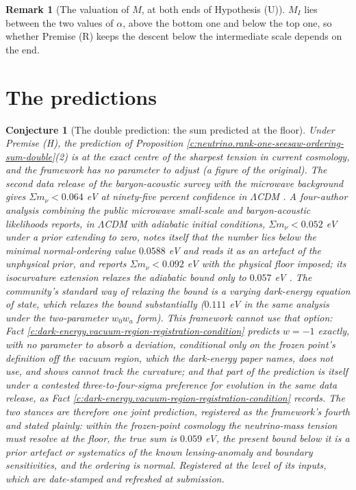 \documentclass[11pt]{article}
\newtheorem{conjecture}[theorem]{Conjecture}
\theoremstyle{definition}
\newtheorem{remark}[theorem]{Remark}
\theoremstyle{plain}
\providecommand{\mnu}{}\renewcommand{\mnu}{\Sigma m_{\nu}}
\begin{document}
\begin{remark}[The valuation of $M$, at both ends of Hypothesis (U)]
$M_{I}$ lies between the two values of $\alpha$, above the bottom one and below the top one, so whether Premise (R) keeps the descent below the intermediate scale depends on the end.
\end{remark}

\section{The predictions}

\begin{conjecture}[The double prediction: the sum predicted at the floor]\label{c:neutrino.double-prediction-sum-predicted-floor}
Under Premise (H), the prediction of Proposition \ref{c:neutrino.rank-one-seesaw-ordering-sum-double}(2) is at the exact centre of the sharpest tension in current cosmology, and the framework has no parameter to adjust (a figure of the original). The second data release of the baryon-acoustic survey with the microwave background gives $\mnu < 0.064$ eV at ninety-five percent confidence in $\Lambda$CDM \cite{DESI2025}. A four-author analysis combining the public microwave small-scale and baryon-acoustic likelihoods reports, in $\Lambda$CDM with adiabatic initial conditions, $\mnu < 0.052$ eV under a prior extending to zero, notes itself that the number lies \emph{below} the minimal normal-ordering value $0.0588$ eV and reads it as an artefact of the unphysical prior, and reports $\mnu < 0.092$ eV with the physical floor imposed; its isocurvature extension relaxes the adiabatic bound only to $0.057$ eV \cite{HouWangZhaoZhang2026}. The community's standard way of relaxing the bound is a varying dark-energy equation of state, which relaxes the bound substantially ($0.111$ eV in the same analysis under the two-parameter $w_{0}w_{a}$ form). This framework cannot use that option: Fact \ref{c:dark-energy.vacuum-region-registration-condition} predicts $w = -1$ exactly, with no parameter to absorb a deviation, conditional only on the frozen point's definition off the vacuum region, which the dark-energy paper names, does not use, and shows cannot track the curvature; and that part of the prediction is itself under a contested three-to-four-sigma preference for evolution in the same data release, as Fact \ref{c:dark-energy.vacuum-region-registration-condition} records. The two stances are therefore one joint prediction, registered as the framework's fourth and stated plainly: within the frozen-point cosmology the neutrino-mass tension must resolve \emph{at the floor}, the true sum is $0.059$ eV, the present bound below it is a prior artefact or systematics of the known lensing-anomaly and boundary sensitivities, and the ordering is normal. Registered at the level of its inputs, which are date-stamped and refreshed at submission.
\end{conjecture}
\end{document}
